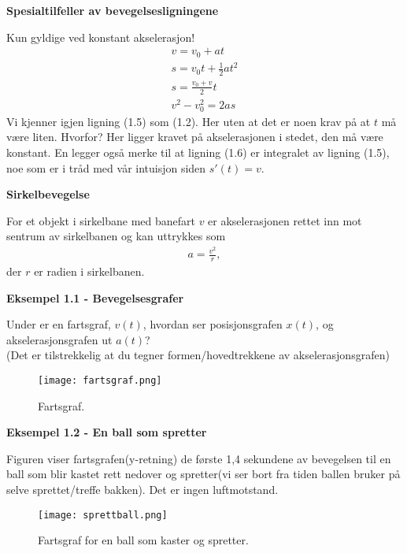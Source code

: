 \documentclass[11pt,a4paper]{article}
\numberwithin{equation}{section}
\begin{document}
\textbf{Spesialtilfeller av bevegelsesligningene}

Kun gyldige ved konstant akselerasjon!
\begin{align}
v = v_0 + at \\
s = v_0t + \frac{1}{2} at^2 \\
s = \frac{v_0 + v}{2}t \\
v^2 - v_0^2 = 2as
\end{align}
Vi kjenner igjen ligning (1.5) som (1.2). Her uten at det er noen krav på at $t$ må være liten. Hvorfor? Her ligger kravet på akselerasjonen i stedet, den må være konstant. En legger også merke til at ligning (1.6) er integralet av ligning (1.5), noe som er i tråd med vår intuisjon siden $s'(t)=v$. 

\textbf{Sirkelbevegelse}

For et objekt i sirkelbane med banefart $v$ er akselerasjonen rettet inn mot sentrum av sirkelbanen og kan uttrykkes som 
\begin{align}
a = \frac{v^2}{r},
\end{align}
der $r$ er radien i sirkelbanen.

\newpage
  
\textbf{Eksempel 1.1 - Bevegelsesgrafer}

Under er en fartsgraf, $v(t)$, hvordan ser posisjonsgrafen $x(t)$, og akselerasjonsgrafen ut $a(t)$? \\
(Det er tilstrekkelig at du tegner formen/hovedtrekkene av akselerasjonsgrafen)

\begin{figure}[h!]
\begin{center}
  \texttt{[image: fartsgraf.png]}
  \end{center}
  \caption{Fartsgraf.}
\end{figure}

\newpage

\textbf{Eksempel 1.2 - En ball som spretter}

Figuren viser fartsgrafen(y-retning) de første 1,4 sekundene av bevegelsen til en ball som blir kastet rett nedover og spretter(vi ser bort fra tiden ballen bruker på selve sprettet/treffe bakken). Det er ingen luftmotstand. 

\begin{figure}[h!]
\begin{center}
  \texttt{[image: sprettball.png]}
  \end{center}
  \caption{Fartsgraf for en ball som kaster og spretter.}
\end{figure}
\end{document}

